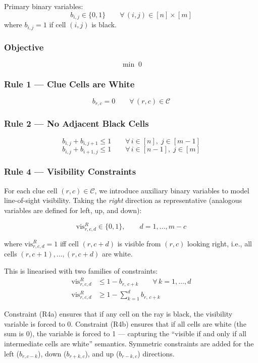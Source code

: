Primary binary variables:
\[
  b_{i,j} \in \{0,1\} \qquad \forall\, (i,j) \in [n] \times [m]
\]
where $b_{i,j} = 1$ if cell $(i,j)$ is black.

\subsubsection{Objective}

\[ \min\; 0 \]

\subsubsection{Rule 1 — Clue Cells are White}

\[
  b_{r,c} = 0 \qquad \forall\, (r,c) \in \mathcal{C}
  \tag{R1}
\]

\subsubsection{Rule 2 — No Adjacent Black Cells}

\[
  b_{i,j} + b_{i,j+1} \leq 1 \qquad \forall\, i \in [n],\; j \in [m-1]
\]
\[
  b_{i,j} + b_{i+1,j} \leq 1 \qquad \forall\, i \in [n-1],\; j \in [m]
  \tag{R2}
\]

\subsubsection{Rule 4 — Visibility Constraints}

For each clue cell $(r,c) \in \mathcal{C}$, we introduce auxiliary binary variables to model line-of-sight visibility. Taking the \emph{right} direction as representative (analogous variables are defined for left, up, and down):

\[
  \text{vis}^{R}_{r,c,d} \in \{0,1\}, \qquad d = 1, \ldots, m - c
\]

where $\text{vis}^{R}_{r,c,d} = 1$ iff cell $(r, c+d)$ is visible from $(r,c)$ looking right, i.e., all cells $(r, c+1), \ldots, (r, c+d)$ are white.

This is linearised with two families of constraints:
\begin{align}
  \text{vis}^{R}_{r,c,d} &\leq 1 - b_{r,\, c+k} \qquad \forall\, k = 1, \ldots, d \tag{R4a}\\
  \text{vis}^{R}_{r,c,d} &\geq 1 - \sum_{k=1}^{d} b_{r,\, c+k} \tag{R4b}
\end{align}

Constraint (R4a) ensures that if any cell on the ray is black, the visibility variable is forced to 0. Constraint (R4b) ensures that if all cells are white (the sum is 0), the variable is forced to 1 — capturing the ``visible if and only if all intermediate cells are white'' semantics. Symmetric constraints are added for the left ($b_{r,c-k}$), down ($b_{r+k,c}$), and up ($b_{r-k,c}$) directions.

